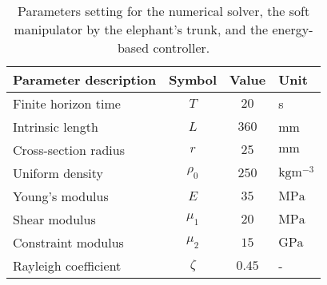 \begin{table}[t]
\vspace{0.2cm}
\caption{Parameters setting for the numerical solver, the soft manipulator  by the elephant's trunk, and the energy-based controller.}\label{tab:C3:parameters2} \centering
\begin{tabular}{l|c|c|l}
  Parameter description & Symbol    & Value    & Unit                     \\
  \midrule
  Finite horizon time   & $T $      & $20$     & s                        \\
  Intrinsic length      & $L $      & $ 360$   & mm                       \\
  Cross-section radius  & $r $      & $ 25$    & $\text{mm}$              \\
  Uniform density       & $\rho_0 $ & $ 250$   & $\text{kg}\text{m}^{-3}$ \\
  Young's modulus       & $E $      & $ 35$    & $\text{MPa}$             \\
  Shear modulus         & $\mu_1 $  & $ 20 $   & $\text{MPa}$             \\
  Constraint modulus    & $\mu_2 $  & $ 15 $   & $\text{GPa}$             \\
  Rayleigh coefficient  & $\zeta $  & $ 0.45 $ & -                        \\
  \bottomrule
\end{tabular}
\end{table}
%

